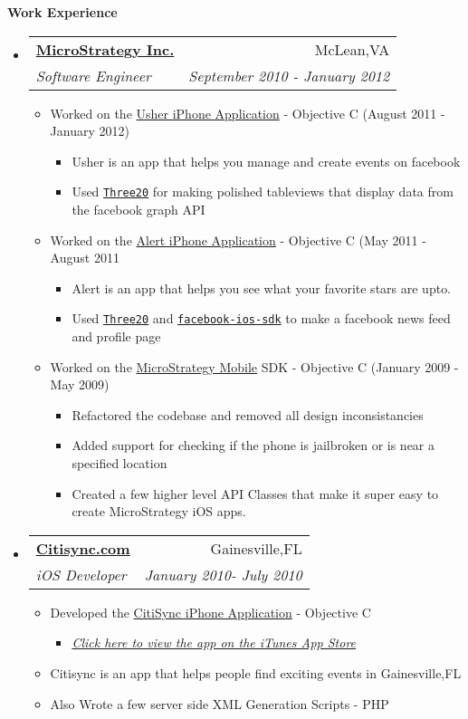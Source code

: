 \documentclass[letterpaper,11pt]{article}
\makeatletter
\newcommand{\resitem}[1]{\item #1 \vspace{-2pt}}
\newcommand{\resheading}[1]{{\large \colorbox{mygrey}{\begin{minipage}{\textwidth}{\textbf{#1 \vphantom{p\^{E}}}}\end{minipage}}}}
\newcommand{\ressubheading}[4]{
\begin{tabular*}{7.0in}{l@{\extracolsep{\fill}}r}
		\textbf{#1} & #2 \\
		\textit{#3} & \textit{#4} \\
\end{tabular*}\vspace{-6pt}}
\makeatother
\begin{document}
\resheading{Work Experience}
\begin{itemize}
\item
    \ressubheading{\href{http://www.microstrategy.com/Company}{MicroStrategy Inc.}}{McLean,VA}{Software Engineer}{September 2010 - January 2012}
    \begin{itemize}
        \resitem{Worked on the \href{http://itunes.apple.com/us/app/usher-by-microstrategy/id477543403}{Usher iPhone Application} - Objective C (August 2011 - January 2012)}
        \begin{itemize}
        	   \resitem{Usher is an app that helps you manage and create events on facebook}
            \resitem{Used \href{http://github.com/facebook/three20}{\texttt{Three20}} for making polished tableviews that display data from the facebook graph API}
        \end{itemize}
        \resitem{Worked on the \href{http://itunes.apple.com/us/app/alert-for-iphone/id442981988?mt=8&ls=1}{Alert iPhone Application} - Objective C (May 2011 - August 2011}
        \begin{itemize}
            \resitem{Alert is an app that helps you see what your favorite stars are upto.}
            \resitem{Used \href{http://github.com/facebook/three20}{\texttt{Three20}}  and  \href{https://github.com/facebook/facebook-ios-sdk}{\texttt{facebook-ios-sdk}} to make a facebook news feed and profile page}
        \end{itemize}
        \resitem{Worked on the \href{http://www.microstrategy.com/mobile/}{MicroStrategy Mobile} SDK - Objective C (January 2009 - May 2009)}
        \begin{itemize}
            \resitem{Refactored the codebase and removed all design inconsistancies}
            \resitem{Added support for checking if the phone is jailbroken or is near a specified location}
            \resitem{Created a few higher level API Classes that make it super easy to create MicroStrategy iOS apps.}
        \end{itemize}
    \end{itemize}

\item
    \ressubheading{\href{http://citisync.com}{Citisync.com}}{Gainesville,FL}{iOS Developer}{January 2010- July 2010}
    \begin{itemize}
        \resitem{Developed the \href{http://citisync.com/iphone}{CitiSync iPhone Application} - Objective C}
        \begin{itemize}
            \resitem{\href{http://itunes.apple.com/us/app/citisync/id387136606?mt=8}{\emph{Click here to view the app on the iTunes App Store}}}
        \end{itemize}
       \resitem{Citisync is an app that helps people find exciting events in Gainesville,FL}
        \resitem{Also Wrote a few server side XML Generation Scripts - PHP}
    \end{itemize}


\end{itemize}
\end{document}
